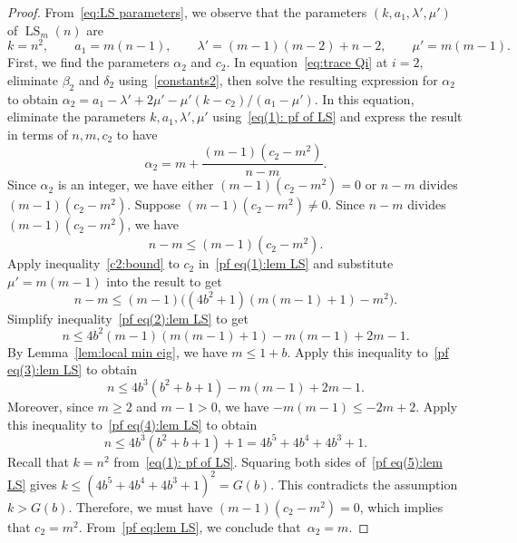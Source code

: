 \documentclass[11pt]{article}
\theoremstyle{definition}
\numberwithin{equation}{section}
\numberwithin{equation}{section}
\begin{document}
\begin{proof} 
From~\eqref{eq:LS parameters}, we observe that the parameters $(k,a_1,\lambda', \mu')$ of $\operatorname{LS}_m(n)$ are 
\begin{equation}\label{eq(1): pf of LS}
	k= n^2, \qquad a_1 =m(n-1), \qquad \lambda' = (m-1)(m-2) +n-2, \qquad \mu' = m(m-1).
\end{equation}
First, we find the parameters $\alpha_2$ and $c_2$.
In equation~\eqref{eq:trace Qi} at $i=2$, eliminate $\beta_2$ and $\delta_2$ using~\eqref{constants2}, then solve the resulting expression for $\alpha_2$ to obtain $\alpha_2 = a_1-\lambda'+2\mu' - {\mu'(k-c_2)}/({a_1-\mu'}).$
In this equation, eliminate the parameters $k, a_1, \lambda', \mu'$ using~\eqref{eq(1): pf of LS} and express the result in terms of $n, m, c_2$ to have 
\begin{equation}\label{pf eq:lem LS}
	\alpha_2 = m + \frac{(m-1)(c_2-m^2)}{n-m}.
\end{equation}
Since $\alpha_2$ is an integer, we have either $(m-1)(c_2-m^2)=0$ or $n-m$ divides \mbox{$(m-1)(c_2-m^2)$}.
Suppose $(m-1)(c_2-m^2) \neq 0$.
Since $n-m$ divides $(m-1)(c_2-m^2)$, we have
\begin{equation}\label{pf eq(1):lem LS}
	n-m \leqslant (m-1)(c_2-m^2).
\end{equation}
Apply inequality~\eqref{c2:bound} to $c_2$ in~\eqref{pf eq(1):lem LS} and substitute $\mu'=m(m-1)$ into the result to get
\begin{equation}\label{pf eq(2):lem LS}
	n - m \leqslant (m-1) \big((4b^2+1)(m(m-1)+1) - m^2 \big).
\end{equation}
Simplify inequality~\eqref{pf eq(2):lem LS} to get
\begin{equation}\label{pf eq(3):lem LS}
	n \leqslant 4b^2 (m-1)(m(m-1)+1) -m(m-1) +2m-1. 
\end{equation}
By Lemma~\ref{lem:local min eig}, we have $m \leqslant 1+b$.
Apply this inequality to~\eqref{pf eq(3):lem LS} to obtain
\begin{equation}\label{pf eq(4):lem LS}
	n \leqslant 4b^3 (b^2+b+1) -m(m-1) +2m-1. 
\end{equation} 
Moreover, since $m \geqslant 2$ and $m-1>0$, we have $-m(m-1) \leqslant -2m+2$.
Apply this inequality to~\eqref{pf eq(4):lem LS} to obtain
\begin{equation}\label{pf eq(5):lem LS}
	n \leqslant 4b^3 (b^2+b+1) +1 = 4b^5 + 4b^4 + 4b^3 + 1. 
\end{equation} 
Recall that $k=n^2$ from~\eqref{eq(1): pf of LS}.
Squaring both sides of~\eqref{pf eq(5):lem LS} gives $k \leqslant (4b^5 + 4b^4 + 4b^3 + 1)^2=G(b)$.
This contradicts the assumption $k > G(b)$.
Therefore, we must have $(m-1)(c_2-m^2)=0$, which implies that $c_2=m^2$.
From~\eqref{pf eq:lem LS}, we conclude that~$\alpha_2=m$.


\end{proof}
\end{document}
